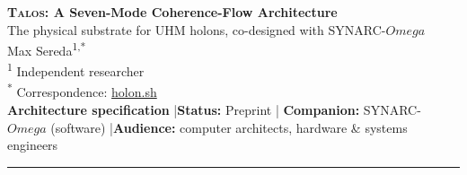 \documentclass[10pt,letterpaper]{article}
\theoremstyle{talos}
\newcommand{\SYNARC}{\textsc{SYNARC}-$\Omega$\xspace}
\def\Omega{Omega}\def\Phi{Phi}\def\Gamma{Gamma}\def\rho{rho}\def\kappa{kappa}\def\varphi{phi}%
\begin{document}
\begin{center}
  {\LARGE\bfseries
  \textsc{Talos}: A Seven-Mode Coherence-Flow Architecture}\\[6pt]
  {\large The physical substrate for UHM holons, co-designed with \SYNARC{}}\\[16pt]
  {\large Max Sereda\textsuperscript{1,*}}\\[8pt]
  {\small
  \textsuperscript{1} Independent researcher\\[4pt]
  \textsuperscript{*} Correspondence: \href{https://holon.sh}{holon.sh}
  }\\[14pt]
  {\small\color{plosgray}
  \textbf{Architecture specification} \quad|\quad \textbf{Status:} Preprint \quad|\quad
  \textbf{Companion:} \SYNARC{} (software) \quad|\quad \textbf{Audience:} computer architects, hardware \& systems engineers
  }
\end{center}

\vspace{10pt}\hrule\vspace{10pt}
\end{document}

